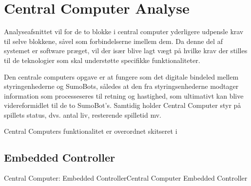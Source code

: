 \section{Central Computer Analyse}\label{sec:CC:analyse}

Analyseafsnittet vil for de to blokke i central computer yderligere udpensle krav til selve blokkene, såvel som forbindelserne imellem dem. Da denne del af systemet er software præget, vil der især blive lagt vægt på hvilke krav der stilles til de teknologier som skal understøtte specifikke funktionaliteter. 

Den centrale computers opgave er at fungere som det digitale bindeled mellem styringenhederne og SumoBots, således at den fra styringsenhederne modtager information som processeseres til retning og hastighed, som ultimativt kan blive videreformidlet til de to SumoBot's. Samtidig holder Central Computer styr på spillets status, dvs. antal liv, resterende spilletid mv. 

Central Computers funktionalitet er overordnet skitseret i 


\subsection{Embedded Controller}


\begin{PartBlokDescription}{Central Computer: Embedded Controller}{Central Computer Embedded Controller}
\end{PartBlokDescription}

